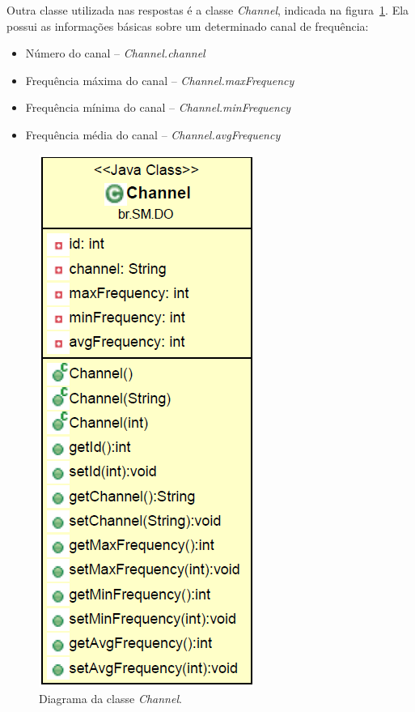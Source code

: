 Outra classe utilizada nas respostas é a classe \textit{Channel}, indicada na figura~\ref{fig:channel}. Ela possui as informações básicas sobre um determinado canal de frequência:

\begin{itemize}
\item Número do canal -- \textit{Channel.channel}
\item Frequência máxima do canal -- \textit{Channel.maxFrequency}
\item Frequência mínima do canal -- \textit{Channel.minFrequency}
\item Frequência média do canal -- \textit{Channel.avgFrequency}
\end{itemize}

\begin{figure}[htb]
\centering
\includegraphics[height=0.4\textheight]{figs/channel}
\caption[Diagrama da classe \textit{Channel}.]
{Diagrama da classe \textit{Channel}.}
\label{fig:channel}
\end{figure} 

